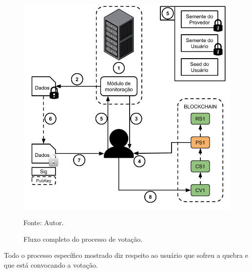 \begin{figure}[ht!]
\caption{Fluxo completo do processo de votação.}
\centering
\includegraphics[width=1\textwidth]{imagens/votacao_detalhada.png}
\begin{center}
        Fonte: Autor.
\end{center}
\label{fig:votacao_detalhada}
\end{figure}

Todo o processo específico mostrado diz respeito ao usuário que sofreu a quebra e que está convocando a votação. 


